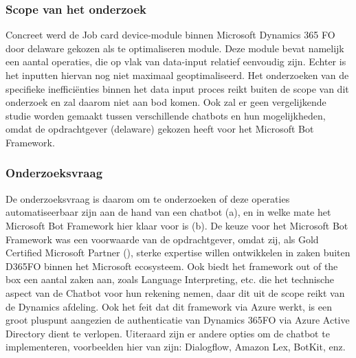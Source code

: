 \subsubsection{Scope van het onderzoek}
Concreet werd de Job card device-module binnen Microsoft Dynamics 365 FO door delaware gekozen als te optimaliseren module. Deze module bevat namelijk een aantal operaties, die op vlak van data-input relatief eenvoudig zijn. Echter is het inputten hiervan nog niet maximaal geoptimaliseerd. Het onderzoeken van de specifieke inefficiënties binnen het data input proces reikt buiten de scope van dit onderzoek en zal daarom niet aan bod komen. Ook zal er geen vergelijkende studie worden gemaakt tussen verschillende chatbots en hun mogelijkheden, omdat de opdrachtgever (delaware) gekozen heeft voor het Microsoft Bot Framework. 

\subsubsection{Onderzoeksvraag}
De onderzoeksvraag is daarom om te onderzoeken of deze operaties automatiseerbaar zijn aan de hand van een chatbot (a), en in welke mate het Microsoft Bot Framework hier klaar voor is (b). De keuze voor het Microsoft Bot Framework was een voorwaarde van de opdrachtgever, omdat zij, als Gold Certified Microsoft Partner (\textcite{delaware2009}), sterke expertise willen ontwikkelen in zaken buiten D365FO binnen het Microsoft ecosysteem. Ook biedt het framework out of the box een aantal zaken aan, zoals Language Interpreting, etc. die het technische aspect van de Chatbot voor hun rekening nemen, daar dit uit de scope reikt van de Dynamics afdeling. Ook het feit dat dit framework via Azure werkt, is een groot pluspunt aangezien de authenticatie van Dynamics 365FO via Azure Active Directory dient te verlopen. Uiteraard zijn er andere opties om de chatbot te implementeren, voorbeelden hier van zijn: Dialogflow, Amazon Lex, BotKit, enz.  



